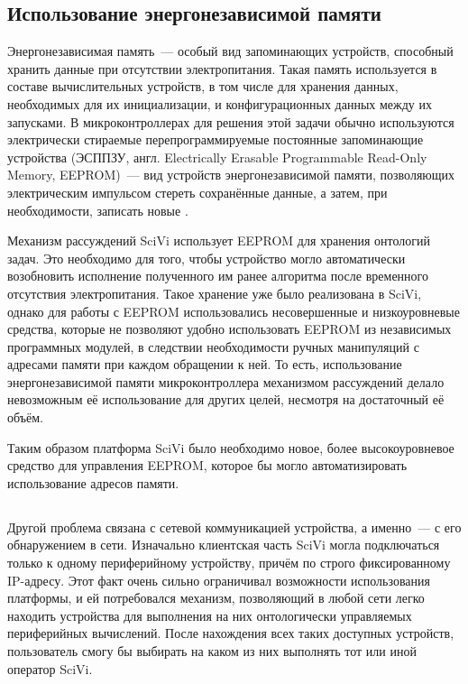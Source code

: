 \subsection{Использование энергонезависимой памяти}

Энергонезависимая память~--- особый вид запоминающих устройств, способный хранить данные при отсутствии электропитания.
Такая память используется в составе вычислительных устройств, в том числе для хранения данных, необходимых для их инициализации, и конфигурационных данных между их запусками.
В микроконтроллерах для решения этой задачи обычно используются электрически стираемые перепрограммируемые постоянные запоминающие устройства (ЭСППЗУ, англ. Electrically Erasable Programmable Read-Only Memory, EEPROM)~--- вид устройств энергонезависимой памяти, позволяющих электрическим импульсом стереть сохранённые данные, а затем, при необходимости, записать новые \cite{incollection:eeprom-proposal, article:eeprom}.

Механизм рассуждений SciVi использует EEPROM для хранения онтологий задач.
Это необходимо для того, чтобы устройство могло автоматически возобновить исполнение полученного им ранее алгоритма после временного отсутствия электропитания.
Такое хранение уже было реализована в SciVi, однако для работы с EEPROM использовались несовершенные и низкоуровневые средства, которые не позволяют удобно использовать EEPROM из независимых программных модулей, в следствии необходимости ручных манипуляций с адресами памяти при каждом обращении к ней.
То есть, использование энергонезависимой памяти микроконтроллера механизмом рассуждений делало невозможным её использование для других целей, несмотря на достаточный её объём.

Таким образом платформа SciVi было необходимо новое, более высокоуровневое средство для управления EEPROM, которое бы могло автоматизировать использование адресов памяти.

\subsection{}

Другой проблема связана с сетевой коммуникацией устройства, а именно~--- с его обнаружением в сети.
Изначально клиентская часть SciVi могла подключаться только к одному периферийному устройству, причём по строго фиксированному IP-адресу.
Этот факт очень сильно ограничивал возможности использования платформы, и ей потребовался механизм, позволяющий в любой сети легко находить устройства для выполнения на них онтологически управляемых периферийных вычислений.
После нахождения всех таких доступных устройств, пользователь смогу бы выбирать на каком из них выполнять тот или иной оператор SciVi.

